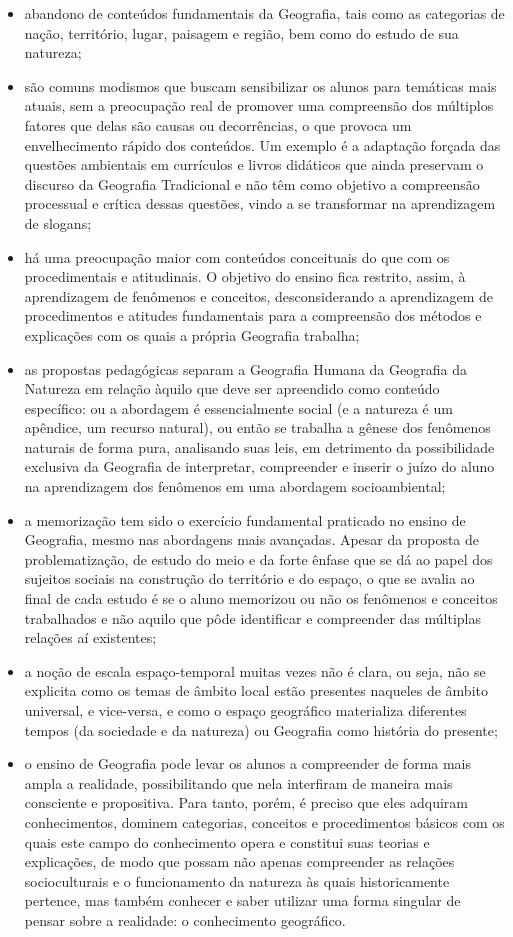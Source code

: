\begin{itemize}
\item abandono de conteúdos fundamentais da Geografia, tais como as categorias de nação, território, lugar, paisagem e região, bem como do estudo de sua natureza;
\item são comuns modismos que buscam sensibilizar os alunos para temáticas mais atuais, sem a preocupação real de promover uma compreensão dos múltiplos fatores que delas são causas 
ou decorrências, o que provoca um envelhecimento rápido dos conteúdos. Um exemplo é a adaptação forçada das questões ambientais em currículos e livros didáticos que ainda preservam o discurso da Geografia Tradicional e não têm como objetivo a compreensão processual e crítica dessas questões, vindo a se transformar na aprendizagem de slogans;
\item  há uma preocupação maior com conteúdos conceituais do que com os procedimentais e atitudinais. O objetivo do ensino fica restrito, assim, à aprendizagem de fenômenos e conceitos, desconsiderando a aprendizagem de procedimentos e atitudes fundamentais para a compreensão dos métodos e explicações com os quais a própria Geografia trabalha;
\item  as propostas pedagógicas separam a Geografia Humana da Geografia da Natureza em relação àquilo que deve ser apreendido como conteúdo específico: ou a abordagem é essencialmente social (e a natureza é um apêndice, um recurso natural), ou então se trabalha a gênese dos fenômenos naturais de forma pura, analisando suas leis, em detrimento da possibilidade exclusiva da Geografia de interpretar, compreender e inserir o juízo do aluno na aprendizagem dos fenômenos em uma abordagem socioambiental;
\item  a memorização tem sido o exercício fundamental praticado no ensino de Geografia, mesmo nas abordagens mais avançadas.  Apesar da proposta de problematização, de estudo do meio e da forte ênfase que se dá ao papel dos sujeitos sociais na construção do território e do espaço, o que se avalia ao final de cada estudo é se o aluno memorizou ou não os fenômenos e conceitos trabalhados e não aquilo que pôde identificar e compreender das múltiplas relações aí existentes;
\item  a noção de escala espaço-temporal muitas vezes não é clara, ou seja, não se explicita como os temas de âmbito local estão presentes naqueles de âmbito universal, e vice-versa, e como o espaço geográfico materializa diferentes tempos (da sociedade e da natureza) ou Geografia como história do presente;
\item o ensino de Geografia pode levar os alunos a compreender de forma mais ampla a realidade, possibilitando que nela interfiram de maneira mais consciente e propositiva. Para tanto, porém, é preciso que eles adquiram conhecimentos, dominem categorias, conceitos e procedimentos básicos com os quais este campo do conhecimento opera e constitui suas teorias e explicações, de modo que possam não apenas compreender as relações socioculturais e o funcionamento da natureza às quais historicamente pertence, mas também conhecer e saber utilizar uma forma singular de pensar sobre a realidade: o conhecimento geográfico. 
\end{itemize}

